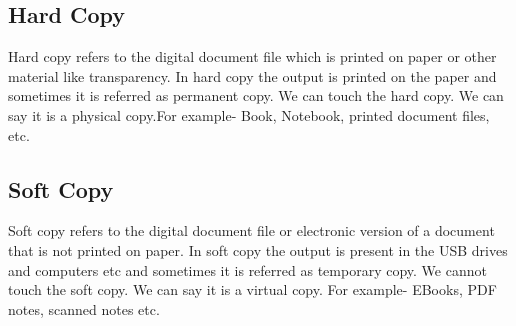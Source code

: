 \documentclass[11pt,a4paper,twoside]{article}
\begin{document}
\subsection{Hard Copy}
Hard copy refers to the digital document file which is printed on paper or other material like transparency. In hard copy the output is printed on the paper and sometimes it is referred as permanent copy. We can touch the hard copy. We can say it is a physical copy.For example- Book, Notebook, printed document files, etc. 
\subsection{Soft Copy}
Soft copy refers to the digital document file or electronic version of a document that is not printed on paper. In soft copy the output is present in the USB drives and computers etc and sometimes it is referred as temporary copy. We cannot touch the soft copy. We can say it is a virtual copy. For example- EBooks, PDF notes, scanned notes etc.
\end{document}
